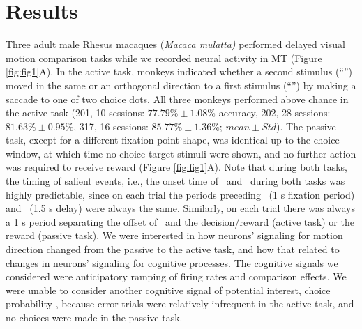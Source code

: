 \section{Results}
Three adult male Rhesus macaques (\textit{Macaca mulatta)} performed delayed visual motion comparison tasks while we recorded neural activity in MT (Figure \ref{fig:fig1}A). 
In the active task, monkeys indicated whether a second stimulus (``\test'') moved in the same or an orthogonal direction to a first stimulus (``\sample'') by making a saccade to one of two choice dots. 
All three monkeys performed above chance in the active task (201, 10 sessions: $77.79\% \pm 1.08\%$ accuracy, 202, 28 sessions: $81.63\% \pm 0.95\%$, 317, 16 sessions: $85.77\% \pm 1.36\%$; $mean \pm Std$). 
The passive task, except for a different fixation point shape, was identical up to the choice window, at which time no choice target stimuli were shown, and no further action was required to receive reward (Figure \ref{fig:fig1}A). 
Note that during both tasks, the timing of salient events, i.e., the onset time of \sample\ and \test\ during both tasks was highly predictable, since on each trial the periods preceding \sample\ (1 s fixation period) and \test\ (1.5 s delay) were always the same. 
Similarly, on each trial there was always a 1 s period separating the offset of \test\ and the decision/reward (active task) or the reward (passive task).
We were interested in how neurons' signaling for motion direction changed from the passive to the active task, and how that related to changes in neurons' signaling for cognitive processes.
The cognitive signals we considered were anticipatory ramping of firing rates and comparison effects. We were unable to consider another cognitive signal of potential interest, choice probability \parencite{Britten1996}, because error trials were relatively infrequent in the active task, and no choices were made in the passive task.




